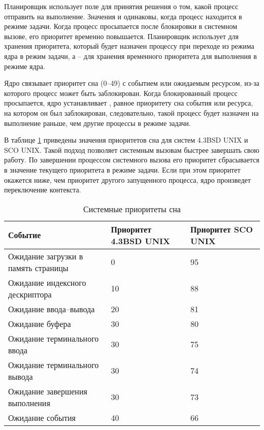 Планировщик использует поле  для принятия решения о том, какой процесс отправить на выполнение. Значения  и  одинаковы, когда процесс находится в режиме задачи. Когда процесс просыпается после блокировки в системном вызове, его приоритет временно повышается. Планировщик использует  для хранения приоритета, который будет назначен процессу при переходе из режима ядра в режим задачи, а  -- для хранения временного приоритета для выполнения в режиме ядра.

Ядро связывает приоритет сна (0--49) с событием или ожидаемым ресурсом, из-за которого процесс может быть заблокирован. Когда блокированный процесс просыпается, ядро устанавливает , равное приоритету сна события или ресурса, на котором он был заблокирован, следовательно, такой процесс будет назначен на выполнение раньше, чем другие процессы в режиме задачи. 

В таблице \ref{tbl:sleeppriority} приведены значения приоритетов сна для систем 4.3BSD UNIX и SCO UNIX. Такой подход позволяет системным вызовам быстрее завершать свою работу. По завершении процессом системного вызова его приоритет сбрасывается в значение текущего приоритета в режиме задачи. Если при этом приоритет окажется ниже, чем приоритет другого запущенного процесса, ядро произведет переключение контекста.
\begin{table}[h]
	\caption{Системные приоритеты сна}
	\begin{center}
		\begin{tabular}{|l|p{75pt}|p{75pt}|} 
			\hline
			\textbf{Событие} & \textbf{Приоритет 4.3BSD UNIX} & \textbf{Приоритет SCO UNIX}\\
			\hline
			{Ожидание загрузки в память страницы} & 0 & 95\\
			\hline
			{Ожидание индексного дескриптора} & 10 & 88\\
			\hline
			{Ожидание ввода--вывода} & 20 & 81 \\
			\hline
			{Ожидание буфера} & 30 & 80\\
			\hline
			{Ожидание терминального ввода} & 30 & 75\\
			\hline
			{Ожидание терминального вывода} & 30 & 74\\
			\hline
			{Ожидание завершения выполнения} & 30 & 73\\
			\hline
			{Ожидание события} & 40 & 66\\
			\hline
		\end{tabular}
	\end{center}
	\label{tbl:sleeppriority}
\end{table}

